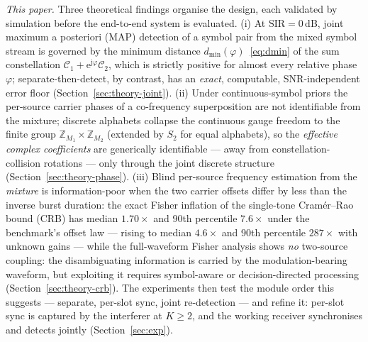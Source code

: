 \documentclass[journal]{IEEEtran}
\newcommand{\sir}{\mathrm{SIR}}
\newcommand{\ee}{\mathrm{e}}
\newcommand{\jj}{\mathrm{j}}
\newcommand{\const}{\mathcal{C}}
\begin{document}
\emph{This paper.} Three theoretical findings organise the design,
each validated by simulation before the end-to-end system is evaluated.
(i) At $\sir = 0$\,dB, joint maximum a posteriori (MAP)
detection of a symbol pair from the mixed symbol stream is governed by
the minimum distance $d_{\min}(\varphi)$~\eqref{eq:dmin} of the sum constellation
$\const_1 + \ee^{\jj\varphi}\const_2$, which is strictly positive for
almost every relative phase $\varphi$; separate-then-detect, by
contrast, has an \emph{exact}, computable, SNR-independent error floor
(Section~\ref{sec:theory-joint}). (ii) Under continuous-symbol priors
the per-source carrier phases of a co-frequency superposition are not
identifiable from the mixture; discrete alphabets collapse the
continuous gauge freedom to the finite group $\mathbb{Z}_{M_1} \times
\mathbb{Z}_{M_2}$ (extended by $S_2$ for equal alphabets), so the
\emph{effective complex coefficients} are generically identifiable ---
away from constellation-collision rotations --- only through the joint
discrete structure (Section~\ref{sec:theory-phase}). (iii) Blind per-source
frequency estimation from the \emph{mixture} is information-poor when
the two carrier offsets differ by less than the inverse burst duration:
the exact Fisher inflation of the single-tone Cram\'er--Rao bound (CRB)
has median $1.70\times$ and 90th percentile $7.6\times$ under the
benchmark's offset law --- rising to median $4.6\times$ and 90th
percentile $287\times$ with unknown gains ---
while the full-waveform Fisher analysis shows \emph{no} two-source
coupling: the disambiguating information is carried by the
modulation-bearing waveform, but exploiting it requires symbol-aware
or decision-directed processing (Section~\ref{sec:theory-crb}). The experiments
then test the module order this suggests --- separate, per-slot sync,
joint re-detection --- and refine it: per-slot sync is captured by the
interferer at $K \geq 2$, and the working receiver synchronises and
detects jointly (Section~\ref{sec:exp}).
\end{document}
